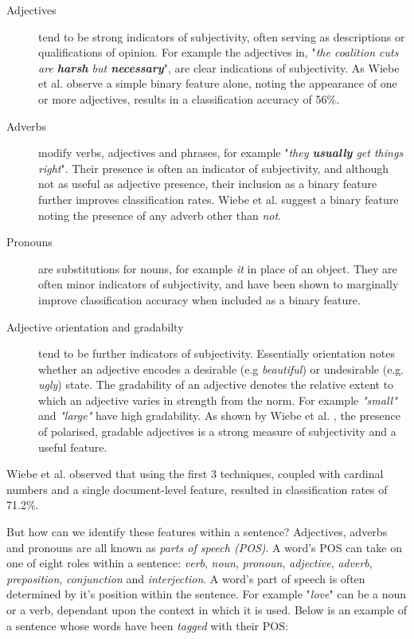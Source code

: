 \begin{description}
	
	\item [Adjectives] tend to be strong indicators of subjectivity, often serving as descriptions or qualifications of opinion. For example the adjectives in, "\emph{the coalition cuts are \textbf{harsh} but \textbf{necessary}}", are clear indications of subjectivity. As Wiebe et al. \cite{Wiebe:1999cj} observe a simple binary feature alone, noting the appearance of one or more adjectives, results in a classification accuracy of 56\%. 
	
	\item [Adverbs] modify verbs, adjectives and phrases, for example "\emph{they \textbf{usually} get things right}". Their presence is often an indicator of subjectivity, and although not as useful as adjective presence, their inclusion as a binary feature further improves classification rates. Wiebe et al. \cite{Wiebe:1999cj} suggest a binary feature noting the presence of any adverb other than \emph{not}.
	
	\item [Pronouns] are substitutions for nouns, for example \emph{it} in place of an object. They are often minor indicators of subjectivity, and have been shown to marginally improve classification accuracy when included as a binary feature.
		
	\item [Adjective orientation and gradabilty] tend to be further indicators of subjectivity. Essentially orientation notes whether an adjective encodes a desirable (e.g \emph{beautiful}) or undesirable (e.g. \emph{ugly}) state. The gradability of an adjective denotes the relative extent to which an adjective varies in strength from the norm. For example \emph{"small"} and \emph{"large"} have high gradability. As shown by Wiebe et al. \cite{Wiebe:2000tk}, the presence of polarised, gradable adjectives is a strong measure of subjectivity and a useful feature.
	
\end{description}

Wiebe et al. \cite{Wiebe:1999cj} observed that using the first 3 techniques, coupled with cardinal numbers and a single document-level feature, resulted in classification rates of 71.2\%. 

But how can we identify these features within a sentence? Adjectives, adverbs and pronouns are all known as \emph{parts of speech (POS)}. A word's POS can take on one of eight roles within a sentence: \emph{verb}, \emph{noun}, \emph{pronoun}, \emph{adjective}, \emph{adverb}, \emph{preposition}, \emph{conjunction} and \emph{interjection}. A word's part of speech is often determined by it's position within the sentence. For example "\emph{love}" can be a noun or a verb, dependant upon the context in which it is used. Below is an example of a sentence whose words have been \emph{tagged} with their POS:

